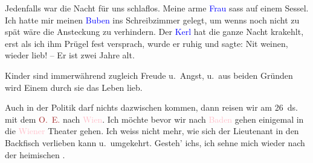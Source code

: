 \pstart
           Jedenfalls war die Nacht für uns schlaflos. Meine arme \textcolor{blue}{Frau}\ledrightnote{{$\rightarrow$}\emph{\textcolor{blue}{Julie Herzl}}} sass auf einem Sessel. Ich hatte mir
               meinen \textcolor{blue}{Buben}\ledrightnote{{$\rightarrow$}\emph{\textcolor{blue}{Hans Herzl}}} ins
               Schreibzimmer gelegt, um wenns noch nicht zu {\pb}spät wäre die Ansteckung zu verhindern.
               Der \textcolor{blue}{Kerl}\ledrightnote{{$\rightarrow$}\emph{\textcolor{blue}{Hans Herzl}}} hat die ganze Nacht
               krakehlt, erst als ich ihm Prügel fest versprach, wurde er ruhig und sagte: Nit
               weinen, wieder lieb! – Er ist zwei Jahre alt.\pend
           
\pstart
           Kinder sind immerwährend zugleich Freude u. Angst, u. aus beiden Gründen wird Einem
               durch sie das Leben lieb.\pend
           
\pstart
           Auch in der Politik darf nichts dazwischen kommen, dann reisen wir am
                  26 ds. mit dem \textcolor{brown}{O. E.}\ledrightnote{\textcolor{brown}{Orient Express}} nach \textcolor{pink}{Wien}\ledrightnote{\textcolor{pink}{Wien}}. Ich möchte bevor wir nach \textcolor{pink}{Baden}\ledrightnote{\textcolor{pink}{Baden bei Wien}} gehen einigemal in die \textcolor{pink}{Wiener}\ledrightnote{\textcolor{pink}{Wien}} Theater gehen. Ich weiss nicht mehr, wie sich der Lieutenant in den
               Backfisch verlieben kann u. umgekehrt. Gesteh’ ichs, ich sehne mich wieder nach der
               heimischen \label{K_L03830-2v}\label{K_L03830-2}.\pend
           
